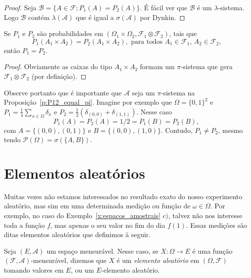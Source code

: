 \begin{proof}
  Seja $\mathcal{B} = \{A \in \mathcal{F}; P_1(A) = P_2(A)\}$.
  É fácil ver que $\mathcal{B}$ é um $\lambda$-sistema.
  Logo $\mathcal{B}$ contém $\lambda(\mathcal{A})$ que é igual a $\sigma(\mathcal{A})$ por Dynkin.
\end{proof}

\begin{corollary}
  \label{c:produto_e_unico}
  Se $P_1$ e $P_2$ são probabilidades em $(\Omega_1 \times \Omega_2, \mathcal{F}_1 \otimes \mathcal{F}_2)$, tais que
  \begin{equation}
    P_1(A_1 \times A_2) = P_2(A_1 \times A_2), \text{ para todos $A_1 \in \mathcal{F}_1$, $A_2 \in \mathcal{F}_2$,}
  \end{equation}
  então $P_1 = P_2$.
\end{corollary}

\begin{proof}
  Obviamente as caixas do tipo $A_1 \times A_2$ formam um $\pi$-sistema que gera $\mathcal{F}_1 \otimes \mathcal{F}_2$ (por definição).
\end{proof}

\begin{example}
  Observe portanto que é importante que $\mathcal{A}$ seja um $\pi$-sistema na Proposição~\ref{p:P12_equal_pi}.
  Imagine por exemplo que $\Omega = \{0,1\}^2$ e $P_1 = \tfrac 14 \sum_{x \in \Omega} \delta_x$ e $P_2 = \tfrac 12 (\delta_{(0,0)} + \delta_{(1,1)})$.
  Nesse caso
  \begin{equation}
    P_1(A) = P_2(A) = 1/2 = P_1(B) = P_2(B),
  \end{equation}
  com $A = \{(0,0), (0,1)\}$ e $B = \{(0,0), (1,0)\}$.
  Contudo, $P_1 \neq P_2$, mesmo tendo $\mathcal{P}(\Omega) = \sigma(\{A,B\})$.
\end{example}


\section{Elementos aleatórios}

Muitas vezes não estamos interessados no resultado exato do nosso experimento aleatório, mas sim em uma determinada medição ou função de $\omega \in \Omega$.
Por exemplo, no caso do Exemplo~\ref{x:espacos_amostrais} $c)$, talvez não nos interesse toda a função $f$, mas apenas o seu valor no fim do dia $f(1)$.
Essas medições são ditas elementos aleatórios que definimos à seguir.

Seja $(E,\mathcal{A})$ um espaço mensurável.
Nesse caso, se $X: \Omega \to E$ é uma função $(\mathcal{F}, \mathcal{A})$-mensurável, dizemos que $X$ é um \emph{elemento aleatório}  em $(\Omega, \mathcal{F})$ tomando valores em $E$, ou um $E$-elemento aleatório.

